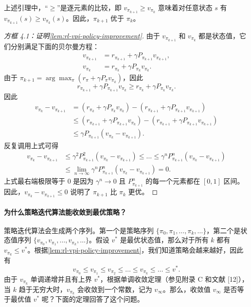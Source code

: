 上述引理中，“$\geqslant$”是逐元素的比较，即 $v_{\pi_{k+1}} \geqslant v_{\pi_{k}}$ 意味着对任意状态 $s$ 有 $v_{\pi_{k+1}}(s) \geqslant v_{\pi_{k}}(s)$。因此，$\pi_{k+1}$ 优于 $\pi_{k}$。

\begin{proof}[方框 4.1：证明\cref{lem:rl-vpi-policy-improvement}]
由于 $v_{\pi_{k+1}}$ 和 $v_{\pi_{k}}$ 都是状态值，它们分别满足下面的贝尔曼方程：
\begin{align*}
v_{\pi_{k+1}} &= r_{\pi_{k+1}} + \gamma P_{\pi_{k+1}} v_{\pi_{k+1}}, \\
v_{\pi_{k}}   &= r_{\pi_{k}} + \gamma P_{\pi_{k}} v_{\pi_{k}}.
\end{align*}
由于 $\pi_{k+1} = \arg\max_{\pi}(r_{\pi} + \gamma P_{\pi} v_{\pi_{k}})$，因此
$$
r_{\pi_{k+1}} + \gamma P_{\pi_{k+1}} v_{\pi_{k}} \geqslant r_{\pi_{k}} + \gamma P_{\pi_{k}} v_{\pi_{k}}.
$$
因此
\begin{align*}
v_{\pi_{k}} - v_{\pi_{k+1}}
&= (r_{\pi_{k}} + \gamma P_{\pi_{k}} v_{\pi_{k}}) - (r_{\pi_{k+1}} + \gamma P_{\pi_{k+1}} v_{\pi_{k+1}}) \\
&\leqslant (r_{\pi_{k+1}} + \gamma P_{\pi_{k+1}} v_{\pi_{k}}) - (r_{\pi_{k+1}} + \gamma P_{\pi_{k+1}} v_{\pi_{k+1}}) \\
&\leqslant \gamma P_{\pi_{k+1}} (v_{\pi_{k}} - v_{\pi_{k+1}}).
\end{align*}
反复调用上式可得
\begin{align*}
v_{\pi_{k}} - v_{\pi_{k+1}}
&\leqslant \gamma^{2} P_{\pi_{k+1}}^{2} (v_{\pi_{k}} - v_{\pi_{k+1}}) \leqslant \ldots \leqslant \gamma^{n} P_{\pi_{k+1}}^{n} (v_{\pi_{k}} - v_{\pi_{k+1}}) \\
&\leqslant \lim_{n \to \infty} \gamma^{n} P_{\pi_{k+1}}^{n} (v_{\pi_{k}} - v_{\pi_{k+1}}) = 0.
\end{align*}
上式最右端极限等于 0 是因为 $\gamma^{n} \to 0$ 且 $P_{\pi_{k+1}}^{n}$ 的每一个元素都在 $[0,1]$ 区间。因此，$v_{\pi_{k}} - v_{\pi_{k+1}} \leqslant 0$ 说明了 $\pi_{k+1}$ 比 $\pi_{k}$ 更优。
\end{proof}

\paragraph{为什么策略迭代算法能收敛到最优策略？}

策略迭代算法会生成两个序列。第一个是策略序列 $\{\pi_0, \pi_1, \ldots, \pi_k, \ldots\}$，第二个是状态值序列 $\{v_{\pi_0}, v_{\pi_1}, \ldots, v_{\pi_k}, \ldots\}$。假设 $v^{*}$ 是最优状态值，那么对于所有 $k$ 都有 $v_{\pi_k} \leqslant v^{*}$。根据\cref{lem:rl-vpi-policy-improvement}，我们知道策略会越来越好，因此有
$$
v_{\pi_{0}} \leqslant v_{\pi_{1}} \leqslant v_{\pi_{2}} \leqslant \ldots \leqslant v_{\pi_{k}} \leqslant \ldots \leqslant v^{*}.
$$
由于 $v_{\pi_k}$ 单调递增并且有上界 $v^{*}$，根据单调收敛定理（参见附录 C 和文献 [12]），当 $k$ 趋于无穷大时，$v_{\pi_k}$ 会收敛到一个常数，记为 $v_{\infty}$。那么，收敛值 $v_{\infty}$ 是否等于最优值 $v^{*}$ 呢？下面的定理回答了这个问题。

